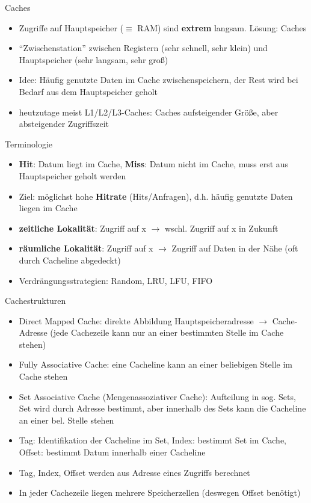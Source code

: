 \documentclass[
  german,            %
  aspectratio=169,    %
]{tumbeamer}
\begin{document}
\begin{frame}[fragile, c]{Caches}{}
  \begin{itemize}
    \item Zugriffe auf Hauptspeicher ($\equiv$ RAM) sind \textbf{extrem} langsam. Lösung: Caches
    \item \enquote{Zwischenstation} zwischen Registern (sehr schnell, sehr klein) und Hauptspeicher (sehr langsam, sehr groß)
    \item Idee: Häufig genutzte Daten im Cache zwischenspeichern, der Rest wird bei Bedarf aus dem Hauptspeicher geholt
    \item heutzutage meist L1/L2/L3-Caches: Caches aufsteigender Größe, aber absteigender Zugriffszeit
  \end{itemize}
\end{frame}


\begin{frame}[c, fragile]{Terminologie}
  \begin{itemize}
    \item \textbf{Hit}: Datum liegt im Cache, \textbf{Miss}: Datum nicht im Cache, muss erst aus Hauptspeicher geholt werden
    \item Ziel: möglichst hohe \textbf{Hitrate} (Hits/Anfragen), d.h. häufig genutzte Daten liegen im Cache
    \item \textbf{zeitliche Lokalität}: Zugriff auf x $\rightarrow$ wschl. Zugriff auf x in Zukunft
    \item \textbf{räumliche Lokalität}: Zugriff auf x $\rightarrow$ Zugriff auf Daten in der Nähe (oft durch Cacheline abgedeckt)
    \item Verdrängungsstrategien: Random, LRU, LFU, FIFO
  \end{itemize}
\end{frame}

\begin{frame}[c, fragile]{Cachestrukturen}
  \begin{itemize}
    \item Direct Mapped Cache: direkte Abbildung Hauptspeicheradresse $\rightarrow$ Cache-Adresse (jede Cachezeile kann nur an einer bestimmten Stelle im Cache stehen)
    \item Fully Associative Cache: eine Cacheline kann an einer beliebigen Stelle im Cache stehen
    \item Set Associative Cache (Mengenassoziativer Cache): Aufteilung in sog. Sets, Set wird durch Adresse bestimmt, aber innerhalb des Sets kann die Cacheline an einer bel. Stelle stehen
    \item Tag: Identifikation der Cacheline im Set, Index: bestimmt Set im Cache, Offset: bestimmt Datum innerhalb einer Cacheline
    \item Tag, Index, Offset werden aus Adresse eines Zugriffs berechnet
    \item In jeder Cachezeile liegen mehrere Speicherzellen (deswegen Offset benötigt)
  \end{itemize}
\end{frame}
\end{document}
